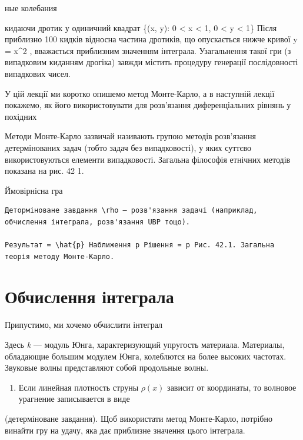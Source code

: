 \documentclass[
  ukrainian,
]{article}
\providecommand{\tightlist}{%
  \setlength{\itemsep}{0pt}\setlength{\parskip}{0pt}}
\begin{document}
ные колебания

кидаючи дротик у одиничний квадрат \{(x, y): 0 \textless{} x \textless{}
1, 0 \textless{} y \textless{} 1\} Після приблизно 100 кидків відносна
частина дротиків, що опускається нижче кривої y = x\^{}2 , вважається
приблизним значенням інтеграла. Узагальнення такої гри (з випадковим
киданням дрогіка) завжди містить процедуру генерації послідовності
випадкових чисел.

У цій лекції ми коротко опишемо метод Монте-Карло, а в наступній лекції
покажемо, як його використовувати для розв'язання диференціальних
рівнянь у похідних

Методи Монте-Карло зазвичай називають групою методів розв'язання
детермінованих задач (тобто задач без випадковості), у яких суттєво
використовуються елементи випадковості. Загальна філософія етнічних
методів показана на рис. 42 1.

Ймовірнісна гра

\begin{verbatim}
Деторміноване завдання \rho — розв'язання задачі (наприклад, обчислення інтеграла, розв'язання UBP тощо).

Результат = \hat{p} Наближення p Рішення = p Рис. 42.1. Загальна теорія методу Монте-Карло.
\end{verbatim}

\section{Обчислення
інтеграла}\label{ux43eux431ux447ux438ux441ux43bux435ux43dux43dux44f-ux456ux43dux442ux435ux433ux440ux430ux43bux430}

Припустимо, ми хочемо обчислити інтеграл

Здесь \emph{k} --- модуль Юнга, характеризующий упругость материала.
Материалы, обладающие большим модулем Юнга, колеблются на более высоких
частотах. Звуковые волны представляют собой продольные волны.

\begin{enumerate}
\def\labelenumi{\arabic{enumi}.}
\setcounter{enumi}{1}
\tightlist
\item
  Если линейная плотность струны \(\rho(x)\) зависит от координаты, то
  волновое урагнение записывается в виде
\end{enumerate}

(детерміноване завдання). Щоб використати метод Монте-Карло, потрібно
винайти гру на удачу, яка дає приблизне значення цього інтеграла.
\end{document}
